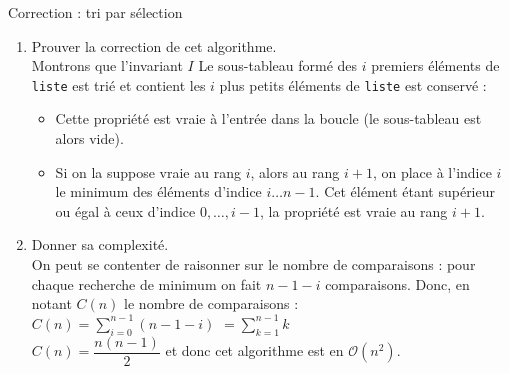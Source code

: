 \documentclass[10pt]{beamer}
\begin{document}
\begin{frame}[fragile]{\Ctitle}{\stitle}
	\begin{exampleblock}{Correction : tri par sélection}
		\begin{enumerate}
			\addtocounter{enumi}{2}
			\item<1-> Prouver la correction de cet algorithme.\\
				\onslide<2->\textcolor{OliveGreen}{\small Montrons que l'invariant $I$ \og{} Le sous-tableau formé des $i$ premiers éléments de {\tt liste} est trié et contient les $i$ plus petits éléments de {\tt liste} \fg{} est conservé :}
				\begin{itemize}
					\item<3-> \textcolor{OliveGreen}{Cette propriété est vraie à l'entrée dans la boucle (le sous-tableau est alors vide).}
					\item<4-> \textcolor{OliveGreen}{Si on la suppose vraie au rang $i$, alors au rang $i+1$, on place à l'indice $i$ le minimum des éléments d'indice $i \dots n-1$. Cet élément étant supérieur ou égal à ceux d'indice $0, \dots, i-1$, la propriété est vraie au rang $i+1$.}
				\end{itemize}
			\item<5-> Donner sa complexité. \\
				\onslide<6->\textcolor{OliveGreen}{\small On peut se contenter de raisonner sur le nombre de comparaisons : pour chaque recherche de minimum on fait $n-1-i$ comparaisons. Donc, en notant $C(n)$ le nombre de comparaisons :\\}
				\onslide<7->\textcolor{OliveGreen}{$C(n)=\displaystyle{\sum_{i=0}^{n-1} (n-1-i)}$}
				\onslide<8->\textcolor{OliveGreen}{$=\displaystyle{\sum_{k=1}^{n-1} k}$\\}
				\onslide<9->\textcolor{OliveGreen}{$C(n)=\dfrac{n(n-1)}{2}$ et donc cet algorithme est en $\mathcal{O}(n^2)$.}
		\end{enumerate}
	\end{exampleblock}
\end{frame}
\end{document}
